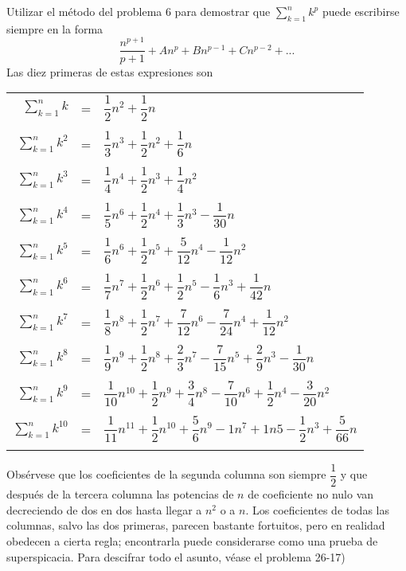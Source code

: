\begin{teo}
Utilizar el método del problema 6 para demostrar que $\displaystyle\sum_{k=1}^n k^p$ puede escribirse siempre en la forma $$\dfrac{n^{p+1}}{p+1} + An^p + Bn^{p-1} + Cn^{p-2} + ...$$
Las diez primeras de estas expresiones son
\begin{center}
\begin{tabular}{r c l}
$\displaystyle\sum_{k=1}^n k$&=&$\dfrac{1}{2}n^2 + \dfrac{1}{2}n$\\\\
$\displaystyle\sum_{k=1}^n k^2$&=&$\dfrac{1}{3} n^3 + \dfrac{1}{2}n^2 + \dfrac{1}{6}n$\\\\
$\displaystyle\sum_{k=1}^n k^3$&=&$\dfrac{1}{4}n^4 + \dfrac{1}{2} n^3 + \dfrac{1}{4} n^2$\\\\
$\displaystyle\sum_{k=1}^n k^4$&=&$\dfrac{1}{5} n^6 + \dfrac{1}{2} n^4 + \dfrac{1}{3} n^3 - \dfrac{1}{30}n$\\\\
$\displaystyle\sum_{k=1}^n k^5$&=&$\dfrac{1}{6}n^6 + \dfrac{1}{2} n^5 + \dfrac{5}{12}n^4 - \dfrac{1}{12}n^2$\\\\
$\displaystyle\sum_{k=1}^n k^6$&=&$\dfrac{1}{7}n^7 + \dfrac{1}{2}n^6 + \dfrac{1}{2}n^5 - \dfrac{1}{6}n^3 + \dfrac{1}{42}n$\\\\
$\displaystyle\sum_{k=1}^n k^7$&=&$\dfrac{1}{8}n^8 + \dfrac{1}{2}n^7 + \dfrac{7}{12}n^6 - \dfrac{7}{24}n^4 + \dfrac{1}{12}n^2$\\\\
$\displaystyle\sum_{k=1}^n k^8$&=&$\dfrac{1}{9}n^9 + \dfrac{1}{2}n^8 + \dfrac{2}{3}n^7 - \dfrac{7}{15}n^5 + \dfrac{2}{9}n^3 - \dfrac{1}{30}n$\\\\
$\displaystyle\sum_{k=1}^n k^9$&=&$\dfrac{1}{10}n^{10} + \dfrac{1}{2} n^9 + \dfrac{3}{4}n^8 - \dfrac{7}{10}n^6 + \dfrac{1}{2}n^4 - \dfrac{3}{20} n^2$\\\\
$\displaystyle\sum_{k=1}^n k^10$&=&$\dfrac{1}{11}n^{11} + \dfrac{1}{2}n^{10} + \dfrac{5}{6}n^9 - 1n^7 + 1n5 - \dfrac{1}{2}n^3 + \dfrac{5}{66}n$\\\\
\end{tabular}
\end{center}
Obsérvese que los coeficientes de la segunda columna son siempre $\dfrac{1}{2}$ y que después de la tercera columna las potencias de $n$ de coeficiente no nulo van decreciendo de dos en dos hasta llegar a $n^2$ o a $n$. Los coeficientes de todas las columnas, salvo las dos primeras, parecen bastante fortuitos, pero en realidad obedecen a cierta regla; encontrarla puede considerarse como una prueba de superspicacia. Para descifrar todo el asunto, véase el problema 26-17)\\\\

\end{teo}
